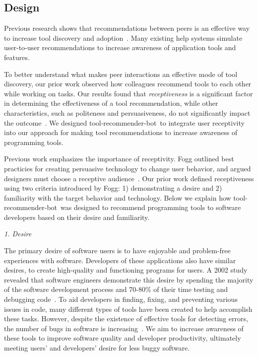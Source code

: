 \documentclass[conference]{IEEEtran}
\newcommand{\tool}{tool-recommender-bot}
\newcommand{\pseudosection}[1]{\vspace{2mm} \noindent {\bf #1}}
\newcommand{\pseudosubsection}[1]{\vspace{2mm} {\it #1}}
\begin{document}
\subsection{Design}
Previous research shows that recommendations between peers is an effective way to increase tool discovery and adoption~\cite{MurphyHill2011PeerInteraction}. Many existing help systems simulate user-to-user recommendations to increase awareness of application tools and features. 

To better understand what makes peer interactions an effective mode of tool discovery, our prior work observed how colleagues recommend tools to each other while working on tasks. Our results found that \emph{receptiveness} is a significant factor in determining the effectiveness of a tool recommendation, while other characteristics, such as politeness and persuasiveness, do not significantly impact the outcome~\cite{vlhcc17}. We designed \tool~to integrate user receptivity into our approach for making tool recommendations to increase awareness of programming tools.

\pseudosection{Receptiveness}

Previous work emphasizes the importance of receptivity. Fogg outlined best practicies for creating persuasive technology to change user behavior, and argued designers must choose a receptive audience~\cite{FoggPersuasive}. Our prior work defined receptiveness using two criteria introduced by Fogg: 1) demonstrating a desire and 2) familiarity with the target behavior and technology. Below we explain how \tool~was designed to recommend programming tools to software developers based on their desire and familiarity.

\pseudosubsection{1. Desire}

The primary desire of software users is to have enjoyable and problem-free experiences with software. Developers of these applications also have similar desires, to create high-quality and functioning programs for users. A 2002 study revealed that software engineers demonstrate this desire by spending the majority of the software development process and 70-80\% of their time testing and debugging code~\cite{NIST}. To aid developers in finding, fixing, and preventing various issues in code, many different types of tools have been created to help accomplish these tasks. However, despite the existence of effective tools for detecting errors, the number of bugs in software is increasing~\cite{HaveThingsChanged}. We aim to increase awareness of these tools to improve software quality and developer productivity, ultimately meeting users' and developers' desire for less buggy software.
\end{document}
